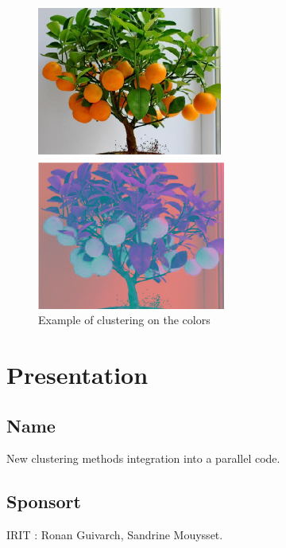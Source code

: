 \documentclass[12pt]{article} %
\begin{document}
\begin{figure}[h!] %
\centering
\includegraphics[width=0.5\linewidth]{Image/tree.png}

\includegraphics[width=0.5\linewidth]{Image/colortree.png}
\caption{ Example of clustering on the colors }

\end{figure}

\section{Presentation}

\subsection{Name} %
New clustering methods integration into a parallel code.
\subsection{Sponsort}
IRIT : Ronan Guivarch, Sandrine Mouysset.
\end{document}
